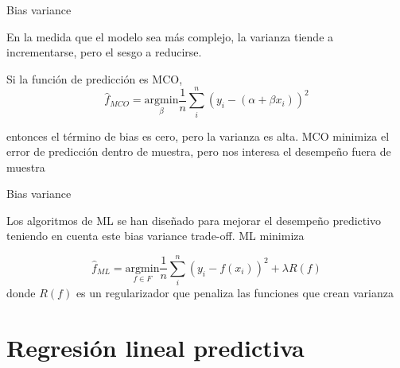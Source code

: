 \documentclass[aspectratio=169,xcolor=dvipsnames]{beamer}
\begin{document}
    \begin{frame}{Bias variance}

    En la medida que el modelo sea más complejo, la varianza tiende a incrementarse, pero el sesgo a reducirse. 

    Si la función de predicción es MCO, 
    \begin{equation*}
    \hat{f}_{MCO}=\underset{\beta}{\mathrm{argmin}} \dfrac{1}{n}\sum_i^n (y_i-(\alpha+\beta x_i))^2  
    \end{equation*}
    
    entonces el término de bias es cero, pero la varianza es alta. MCO minimiza el error de predicción dentro de muestra, pero nos interesa el desempeño fuera de muestra
        
    \end{frame}

    \begin{frame}{Bias variance}

    Los algoritmos de ML se han diseñado para mejorar el desempeño predictivo teniendo en cuenta este bias variance trade-off. ML minimiza

    \begin{equation*}
        \hat{f}_{ML}=\underset{f\in F}{\mathrm{argmin}} \dfrac{1}{n}\sum_i^n (y_i-f(x_i))^2+\lambda R(f)  
    \end{equation*}
    donde $R(f)$ es un regularizador que penaliza las funciones que crean varianza
        
    \end{frame}

    \section{Regresión lineal predictiva}
\end{document}

